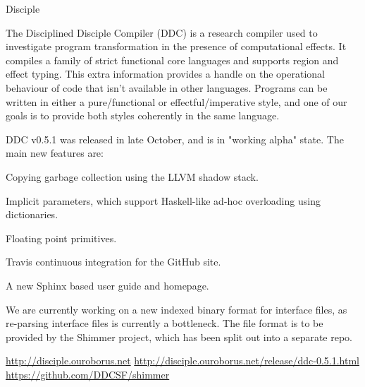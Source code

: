 \begin{hcarentry}{Disciple}
\makeheader

The Disciplined Disciple Compiler (DDC) is a research compiler used to
investigate program transformation in the presence of computational effects.
It compiles a family of strict functional core languages and supports region
and effect typing. This extra information provides a handle on the operational
behaviour of code that isn't available in other languages. Programs can be
written in either a pure/functional or effectful/imperative style, and one of
our goals is to provide both styles coherently in the same language.

\WhatsNew

DDC v0.5.1 was released in late October, and is in "working alpha" state.
The main new features are:

\begin{compactitem}
\item Copying garbage collection using the LLVM shadow stack.
\item Implicit parameters, which support Haskell-like ad-hoc overloading using
 dictionaries.
\item Floating point primitives.
\item Travis continuous integration for the GitHub site.
\item A new Sphinx based user guide and homepage.
\end{compactitem}

We are currently working on a new indexed binary format for interface files,
as re-parsing interface files is currently a bottleneck. The file format is to
be provided by the Shimmer project, which has been split out into a separate repo.

\FurtherReading
  \url{http://disciple.ouroborus.net}
  \url{http://disciple.ouroborus.net/release/ddc-0.5.1.html}
  \url{https://github.com/DDCSF/shimmer}

\end{hcarentry}
